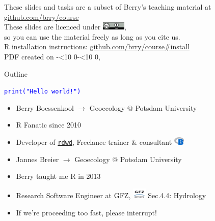 \documentclass[xcolor=table,      handout ,    xcolor=dvipsnames]{beamer}\usepackage[]{graphicx}\usepackage[]{color}
\newcommand{\rcode}[1]{\texttt{\textcolor{Blue}{#1}}}
\newcommand{\leadingzero}[1]{\ifnum #1<10 0\the#1\else\the#1\fi}
\begin{document}
{\begin{frame}
\begin{center}
These slides and tasks are a subset of Berry's teaching material at\\
\href{https://github.com/brry/course}{github.com/brry/course}\\[1em]
These slides are licenced under
\href{https://creativecommons.org/licenses/by/4.0}{\includegraphics[width=3em]{externalfig/ccby.png}},\\
so you can use the material freely as long as you cite us.\\[1em]
R installation instructions: \href{https://github.com/brry/course\#install}{github.com/brry/course\#install}\\[2em]
\scriptsize
PDF created on \the\year-\leadingzero{\month}-\leadingzero{\day}, \currenttime\ \\[1em]
\end{center}
\end{frame}
}


\begin{frame}{Outline}
\tableofcontents[hideallsubsections]
\label{toc}
\end{frame}


\begin{frame}{\rcode{print("Hello world!")}}
\begin{itemize}[<+->]
\item Berry Boessenkool $\rightarrow$ Geoecology @ Potsdam University
\item R Fan\onslide<+->atic \onslide<+-> since 2010
\item Developer of \href{https://github.com/brry/rdwd\#rdwd}{\texttt{rdwd}},
 \onslide<+-> Freelance trainer \& consultant \href{https://brry.github.io}{\includegraphics[width=0.5cm]{externalfig/Blogo.png}}\\[2em]
\item Jannes Breier $\rightarrow$ Geoecology @ Potsdam University
\item Berry taught me R in 2013 \smiley{}
\item \href{https://www.linkedin.com/in/jbreier/}{\faLinkedinSquare} Research Software Engineer at GFZ, \href{https://www.gfz-potsdam.de/en/staff/jannes-breier/sec44/}{\includegraphics[width=0.65cm]{externalfig/GFZ.png}} Sec.4.4: Hydrology \\[2em]
\item \alert{If we're proceeding too fast, please interrupt!}
\end{itemize}
\end{frame}
\end{document}
